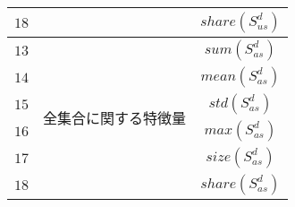 \begin{table}[htpb]
\begin{tabular}{|c|c|c|}
      $18$ & & $share(S^d_{us})$ \\ \hline
      $13$ & \multirow{6}{*}{全集合に関する特徴量} & $sum(S^d_{as})$ \\ \cline{1-1}\cline{3-3}
      $14$ & & $mean(S^d_{as})$ \\ \cline{1-1}\cline{3-3}
      $15$ & & $std(S^d_{as})$ \\ \cline{1-1}\cline{3-3}
      $16$ & & $max(S^d_{as})$ \\ \cline{1-1}\cline{3-3}
      $17$ & & $size(S^d_{as})$ \\ \cline{1-1}\cline{3-3}
      $18$ & & $share(S^d_{as})$ \\ \hline
  \end{tabular}
  \label{tab:features_with_statistics}
\end{table}
